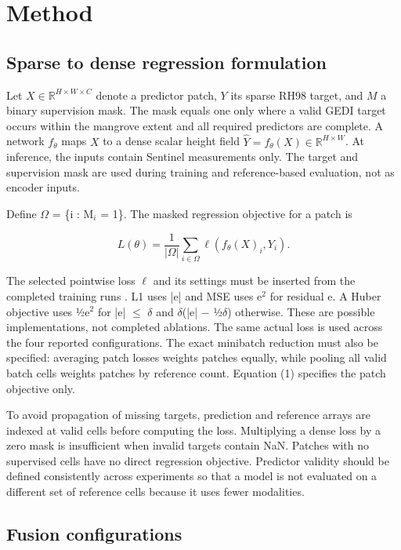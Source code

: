 \section{Method}

\subsection{Sparse to dense regression formulation}

Let $X \in \mathbb{R}^{H\times W\times C}$ denote a predictor patch, $Y$ its sparse RH98 target, and $M$ a binary supervision mask. The mask equals one only where a valid GEDI target occurs within the mangrove extent and all required predictors are complete. A network $f_\theta$ maps $X$ to a dense scalar height field $\hat{Y}=f_\theta(X)\in\mathbb{R}^{H\times W}$. At inference, the inputs contain Sentinel measurements only. The target and supervision mask are used during training and reference-based evaluation, not as encoder inputs.

Define $\Omega$ = \{i : M$_i$ = 1\}. The masked regression objective for a patch is

\begin{equation} L(\theta)=\frac{1}{|\Omega|}\sum_{i\in\Omega}\ell(f_\theta(X)_i,Y_i). \end{equation}

The selected pointwise loss $\ell$ and its settings must be inserted from the completed training runs . L1 uses |e| and MSE uses e$^2$ for residual e. A Huber objective uses ½e$^2$ for |e| $\leq$ $\delta$ and $\delta$(|e| $-$ ½$\delta$) otherwise. These are possible implementations, not completed ablations. The same actual loss is used across the four reported configurations. The exact minibatch reduction must also be specified: averaging patch losses weights patches equally, while pooling all valid batch cells weights patches by reference count. Equation (1) specifies the patch objective only.

To avoid propagation of missing targets, prediction and reference arrays are indexed at valid cells before computing the loss. Multiplying a dense loss by a zero mask is insufficient when invalid targets contain NaN. Patches with no supervised cells have no direct regression objective. Predictor validity should be defined consistently across experiments so that a model is not evaluated on a different set of reference cells because it uses fewer modalities.

\subsection{Fusion configurations}

